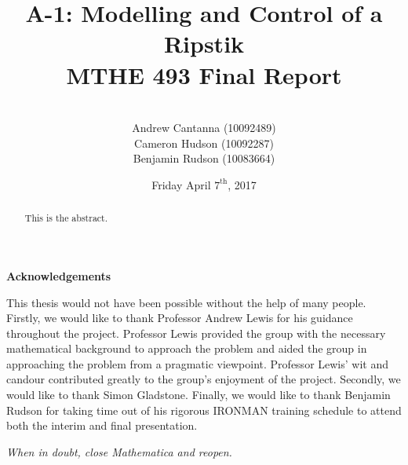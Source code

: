 \documentclass[11pt,letterpaper]{article}
\title{ A-1: Modelling and Control of a Ripstik\textsuperscript{\textregistered} \\MTHE 493 Final Report}
\date{Friday April $7^{\textrm{th}}$, 2017}
\author{\\Andrew Cantanna (10092489) \\Cameron Hudson (10092287)\\
	Benjamin Rudson (10083664)\\}
\theoremstyle{definition}
\begin{document}
	\begin{titlepage}
		\maketitle
		\thispagestyle{empty}		
	\end{titlepage}
	\newpage
\begin{abstract}
	This is the abstract.
\end{abstract}	
\clearpage
\newpage
\begin{center}
\textbf{Acknowledgements}
\end{center}
This thesis would not have been possible without the help of many people. 
Firstly, we would like to thank Professor Andrew Lewis for his guidance throughout the project. 
Professor Lewis provided the group with the necessary mathematical background to approach the problem and aided the group in approaching the problem from a pragmatic viewpoint. 
Professor Lewis' wit and candour contributed greatly to the group's enjoyment of the project.
Secondly, we would like to thank Simon Gladstone.
Finally, we would like to thank Benjamin Rudson for taking time out of his rigorous IRONMAN training schedule to attend both the interim and final presentation. 

\vspace*{\fill}
\begin{center}
\textit{When in doubt, close Mathematica and reopen.}
\end{center}
\newpage	
	\renewcommand{\baselinestretch}{0.75}\normalsize
	\tableofcontents
	\renewcommand{\baselinestretch}{1.0}\normalsize

\newpage
\listoffigures
\newpage
\listoftables


\clearpage
{}
	
	\newpage



	\pagestyle{fancy}







\newpage
\printbibliography
\end{document}
